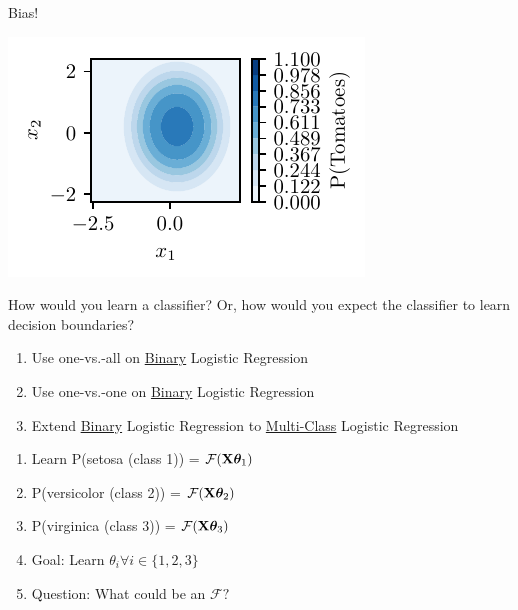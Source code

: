 \documentclass{beamer}
\begin{document}
\begin{frame}Bias! 
\end{frame}

\begin{frame}\includegraphics{../assets/logistic-regression/figures/logisitic-circular-probability.pdf}

\end{frame}

\begin{frame}How would you learn a classifier? Or, how would you expect the classifier to learn decision boundaries?
\end{frame}

\begin{frame}\begin{enumerate}
\item Use one-vs.-all on \underline{Binary} Logistic Regression
\item Use one-vs.-one on \underline{Binary} Logistic Regression
\item Extend \underline{Binary} Logistic Regression to \underline{Multi-Class} Logistic Regression
\end{enumerate}
\end{frame}

\begin{frame}\begin{enumerate}
	\item Learn P(setosa (class 1)) = $\mathcal{F}({\mathbf{X}\boldsymbol{\theta}_1})$
	\item P(versicolor (class 2)) = $\mathcal{F}({\mathbf{X}\boldsymbol{\theta}_2})$
	\item P(virginica (class 3)) = $\mathcal{F}({\mathbf{X}\boldsymbol{\theta}_3})$
	\item Goal: Learn $\theta_i \forall i \in \{1, 2, 3\}$
	\item Question: What could be an $\mathcal{F}?$

\end{enumerate}

\end{frame}
\end{document}
